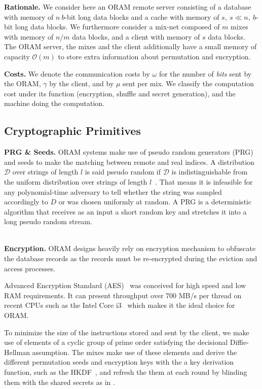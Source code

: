 \documentclass[USenglish,oneside,twocolumn]{article}
\begin{document}
\noindent\textbf{Rationale.} We consider here an ORAM remote server consisting of a database with memory of $n\ b$-bit long data blocks and a cache with memory of $s,\ s\ll n,\ b$-bit long data blocks. We furthermore consider a mix-net composed of $m$ mixes with memory of $n/m$ data blocks, and a client with memory of $s$ data blocks. The ORAM server, the mixes and the client additionally have a small memory of capacity $\mathcal{O}(m)$ to store extra information about permutation and encryption.

\noindent\textbf{Costs.} We denote the communication costs by $\omega$ for the number of \emph{bits} sent by the ORAM, $\gamma$ by the client, and by $\mu$ sent per mix. 
We classify the computation cost under its function (encryption, shuffle and secret generation), and the machine doing the computation. 
%
\subsection{Cryptographic Primitives}

\noindent\textbf{PRG \& Seeds.}
ORAM systems make use of pseudo random generators (PRG) and seeds to make the matching between remote and real indices. A distribution $\mathcal{D}$ over strings of length $l$ is said pseudo random if $\mathcal{D}$ is indistinguishable from the uniform distribution over strings of length $l$~\cite{katz2014introduction}. That means it is infeasible for any polynomial-time adversary to tell whether the string was sampled accordingly to $D$ or was chosen uniformly at random. A PRG is a deterministic algorithm that receives as an input a short random key and stretches it into a long pseudo random stream.\\\

\noindent\textbf{Encryption.}
ORAM designs heavily rely on encryption mechanism to obfuscate the database records as the records must be re-encrypted during the eviction and access processes.

Advanced Encryption Standard (AES)~\cite{daemen2013design} was conceived for high speed and low RAM requirements. It can present throughput over 700 MB/s per thread on recent CPUs such as the Intel Core i3~\cite{mcwilliams2014hardware} which makes it the ideal choice for ORAM.

To minimize the size of the instructions stored and sent by the client, we make use of elements of a cyclic group of prime order satisfying the decisional Diffie-Hellman assumption. The mixes make use of these elements and derive the different permutation seeds and encryption keys with the a key derivation function, such as the HKDF~\cite{XXXHKDF}, and refresh the them at each round by blinding them with the shared secrets as in \cite{danezis2009sphinx}. 
%
\end{document}
